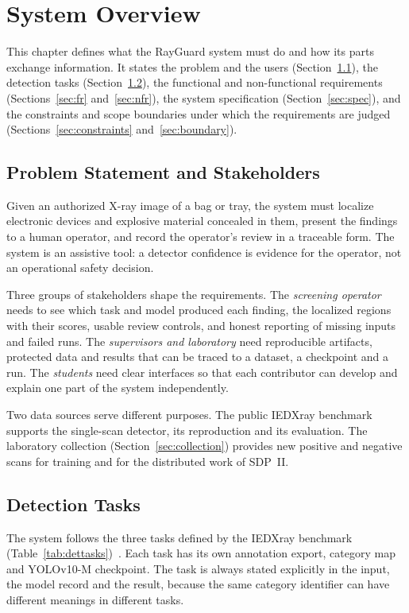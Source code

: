 \chapter{System Overview}\label{ch:system}
This chapter defines what the RayGuard system must do and how its parts exchange
information. It states the problem and the users (Section~\ref{sec:problem}), the
detection tasks (Section~\ref{sec:tasks}), the functional and non-functional
requirements (Sections~\ref{sec:fr} and~\ref{sec:nfr}), the system specification
(Section~\ref{sec:spec}), and the constraints and scope boundaries under which
the requirements are judged (Sections~\ref{sec:constraints}
and~\ref{sec:boundary}).

\section{Problem Statement and Stakeholders}\label{sec:problem}
Given an authorized X-ray image of a bag or tray, the system must localize
electronic devices and explosive material concealed in them, present the findings
to a human operator, and record the operator's review in a traceable form. The
system is an assistive tool: a detector confidence is evidence for the operator,
not an operational safety decision.

Three groups of stakeholders shape the requirements. The \emph{screening operator}
needs to see which task and model produced each finding, the localized regions
with their scores, usable review controls, and honest reporting of missing inputs
and failed runs. The \emph{supervisors and laboratory} need reproducible
artifacts, protected data and results that can be traced to a dataset, a
checkpoint and a run. The \emph{students} need clear interfaces so that each
contributor can develop and explain one part of the system independently.

Two data sources serve different purposes. The public IEDXray benchmark supports
the single-scan detector, its reproduction and its evaluation. The laboratory
collection (Section~\ref{sec:collection}) provides new positive and negative scans
for training and for the distributed work of SDP~II.

\section{Detection Tasks}\label{sec:tasks}
The system follows the three tasks defined by the IEDXray benchmark
(Table~\ref{tab:dettasks})~\citep{takele2026iedxray}. Each task has its own
annotation export, category map and YOLOv10-M checkpoint. The task is always
stated explicitly in the input, the model record and the result, because the same
category identifier can have different meanings in different tasks.

